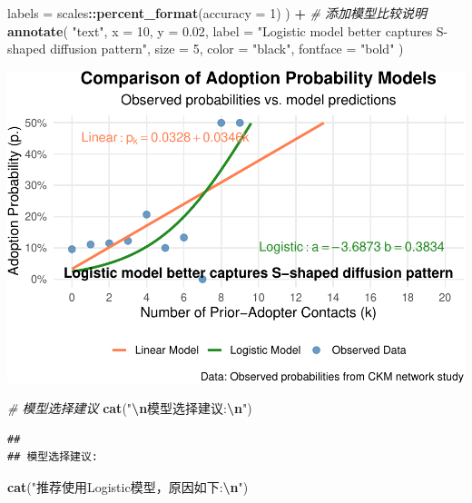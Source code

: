 \documentclass[
]{article}
\newenvironment{Shaded}{\begin{snugshade}}{\end{snugshade}}
\newcommand{\AttributeTok}[1]{\textcolor[rgb]{0.13,0.29,0.53}{#1}}
\newcommand{\CommentTok}[1]{\textcolor[rgb]{0.56,0.35,0.01}{\textit{#1}}}
\newcommand{\DecValTok}[1]{\textcolor[rgb]{0.00,0.00,0.81}{#1}}
\newcommand{\FloatTok}[1]{\textcolor[rgb]{0.00,0.00,0.81}{#1}}
\newcommand{\FunctionTok}[1]{\textcolor[rgb]{0.13,0.29,0.53}{\textbf{#1}}}
\newcommand{\NormalTok}[1]{#1}
\newcommand{\SpecialCharTok}[1]{\textcolor[rgb]{0.81,0.36,0.00}{\textbf{#1}}}
\newcommand{\StringTok}[1]{\textcolor[rgb]{0.31,0.60,0.02}{#1}}
\begin{document}
\begin{Shaded}
\begin{Highlighting}[]
    \AttributeTok{labels =}\NormalTok{ scales}\SpecialCharTok{::}\FunctionTok{percent\_format}\NormalTok{(}\AttributeTok{accuracy =} \DecValTok{1}\NormalTok{)}
\NormalTok{  ) }\SpecialCharTok{+}
  \CommentTok{\# 添加模型比较说明}
  \FunctionTok{annotate}\NormalTok{(}
    \StringTok{"text"}\NormalTok{,}
    \AttributeTok{x =} \DecValTok{10}\NormalTok{,}
    \AttributeTok{y =} \FloatTok{0.02}\NormalTok{,}
    \AttributeTok{label =} \StringTok{"Logistic model better captures S{-}shaped diffusion pattern"}\NormalTok{,}
    \AttributeTok{size =} \DecValTok{5}\NormalTok{,}
    \AttributeTok{color =} \StringTok{"black"}\NormalTok{,}
    \AttributeTok{fontface =} \StringTok{"bold"}
\NormalTok{  )}
\end{Highlighting}
\end{Shaded}

\includegraphics{Homework-04_files/figure-latex/unnamed-chunk-7-1.pdf}

\begin{Shaded}
\begin{Highlighting}[]
\CommentTok{\# 模型选择建议}
\FunctionTok{cat}\NormalTok{(}\StringTok{"}\SpecialCharTok{\textbackslash{}n}\StringTok{模型选择建议:}\SpecialCharTok{\textbackslash{}n}\StringTok{"}\NormalTok{)}
\end{Highlighting}
\end{Shaded}

\begin{verbatim}
## 
## 模型选择建议:
\end{verbatim}

\begin{Shaded}
\begin{Highlighting}[]
\FunctionTok{cat}\NormalTok{(}\StringTok{"推荐使用Logistic模型，原因如下:}\SpecialCharTok{\textbackslash{}n}\StringTok{"}\NormalTok{)}
\end{Highlighting}
\end{Shaded}
\end{document}
